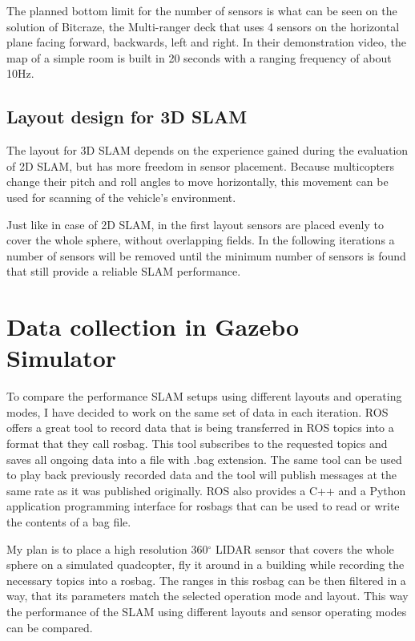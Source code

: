 The planned bottom limit for the number of sensors is what can be seen on the solution of Bitcraze, 
the Multi-ranger deck\cite{BitcrazeMultirangerDeck} that uses 4 sensors on the horizontal plane facing forward, 
backwards, left and right. In their demonstration video, the map of a simple room is built in 20 seconds 
with a ranging frequency of about 10Hz. 

\subsection{Layout design for 3D SLAM}
The layout for 3D SLAM depends on the experience gained during the evaluation of 2D SLAM, but has more 
freedom in sensor placement. Because multicopters change their pitch and roll angles to move horizontally,
this movement can be used for scanning of the vehicle's environment. 

Just like in case of 2D SLAM, in the first layout sensors are placed evenly to cover the whole sphere,
without overlapping fields. In the following iterations a number of sensors will be removed until the 
minimum number of sensors is found that still provide a reliable SLAM performance.



\section{Data collection in Gazebo Simulator}
To compare the performance SLAM setups using different layouts and operating modes, I have decided to 
work on the same set of data in each iteration. ROS offers a great tool to record data that is being 
transferred in ROS topics into a format that they call rosbag. This tool subscribes to the requested
topics and saves all ongoing data into a file with .bag extension. The same tool can be used to play 
back previously recorded data and the tool will publish messages at the same rate as it was 
published originally. ROS also provides a C++ and a Python application programming interface for rosbags
that can be used to read or write the contents of a bag file.

My plan is to place a high resolution 360$^{\circ}$ LIDAR sensor that covers the whole sphere
on a simulated quadcopter, fly it around in a building while recording the necessary topics into a rosbag.
The ranges in this rosbag can be then filtered in a way, that its parameters match the selected operation 
mode and layout. This way the performance of the SLAM using different layouts and sensor operating modes
can be compared.



